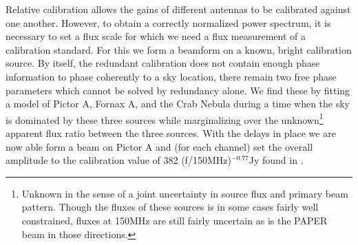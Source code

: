 \documentclass{aastex}
\begin{document}
Relative calibration allows the gains of different antennas to be calibrated against one another.  However, to obtain a correctly normalized power spectrum, it is necessary to set a flux scale for which we need a flux measurement of a calibration standard.  For this we form a beamform on a known, bright calibration source.  By itself, the redundant calibration does not contain enough phase information to phase coherently to a sky location, there remain two free phase parameters which cannot be solved by redundancy alone.   We find these by fitting a model of Pictor A, Fornax A, and the Crab Nebula during a time when the sky is dominated by these three sources while marginalizing over the unknown\footnote{Unknown in the sense of a joint uncertainty in source flux and primary beam pattern. Though the fluxes of these sources is in some cases fairly well constrained, fluxes at 150MHz are still fairly uncertain as is the PAPER beam in those directions.} apparent flux ratio between the three sources. With the delays in place we are now able form a beam on Pictor A and (for each channel) set the overall amplitude to the calibration value of 382 (f/150MHz)$^{-0.77}$Jy found in \cite{jacobs:2013b}.
  
\end{document}
